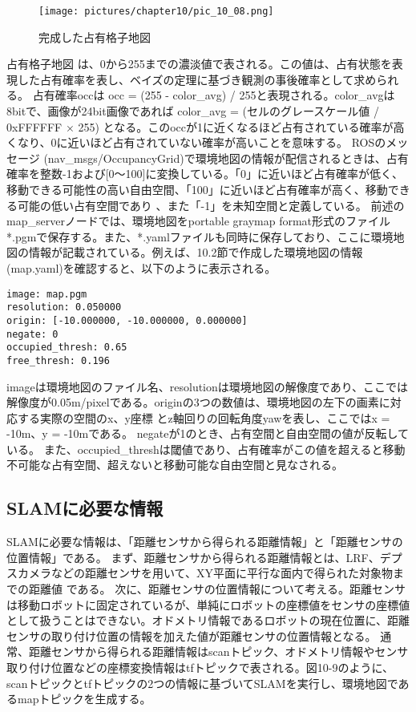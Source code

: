 \begin{figure}[htp]
  \centering
  \texttt{[image: pictures/chapter10/pic\_10\_08.png]}
  \caption{完成した占有格子地図}
\end{figure}

占有格子地図  は、0から255までの濃淡値で表される。この値は、占有状態を表現した占有確率を表し、ベイズの定理に基づき観測の事後確率として求められる。  占有確率occは occ = (255 - color\_avg) / 255と表現される。color\_avgは8bitで、画像が24bit画像であれば color\_avg = (セルのグレースケール値 / 0xFFFFFF × 255) となる。このoccが1に近くなるほど占有されている確率が高くなり、0に近いほど占有されていない確率が高いことを意味する。
ROSのメッセージ (nav\_msgs/OccupancyGrid)で環境地図の情報が配信されるときは、占有確率を整数-1および[0〜100]に変換している。「0」に近いほど占有確率が低く、移動できる可能性の高い自由空間、「100」に近いほど占有確率が高く、移動できる可能の低い占有空間であり  、また「-1」を未知空間と定義している。
前述のmap\_serverノードでは、環境地図をportable graymap format形式のファイル*.pgmで保存する。また、*.yamlファイルも同時に保存しており、ここに環境地図の情報が記載されている。例えば、10.2節で作成した環境地図の情報(map.yaml)を確認すると、以下のように表示される。

\begin{lstlisting}[language=ROS]
image: map.pgm
resolution: 0.050000
origin: [-10.000000, -10.000000, 0.000000]
negate: 0
occupied_thresh: 0.65
free_thresh: 0.196
\end{lstlisting}

imageは環境地図のファイル名、resolutionは環境地図の解像度であり、ここでは解像度が0.05m/pixelである。originの3つの数値は、環境地図の左下の画素に対応する実際の空間のx、y座標  とz軸回りの回転角度yawを表し、ここではx = -10m、y = -10mである。 negateが1のとき、占有空間と自由空間の値が反転している。  また、occupied\_threshは閾値であり、占有確率がこの値を超えると移動不可能な占有空間、超えないと移動可能な自由空間と見なされる。

\subsection{SLAMに必要な情報}

SLAMに必要な情報は、「距離センサから得られる距離情報」と「距離センサの位置情報」である。
まず、距離センサから得られる距離情報とは、LRF、デプスカメラなどの距離センサを用いて、XY平面に平行な面内で得られた対象物までの距離値  である。
次に、距離センサの位置情報について考える。距離センサは移動ロボットに固定されているが、単純にロボットの座標値をセンサの座標値として扱うことはできない。オドメトリ情報であるロボットの現在位置に、距離センサの取り付け位置の情報を加えた値が距離センサの位置情報となる。
通常、距離センサから得られる距離情報はscanトピック、オドメトリ情報やセンサ取り付け位置などの座標変換情報はtfトピックで表される。図10-9のように、scanトピックとtfトピックの2つの情報に基づいてSLAMを実行し、環境地図であるmapトピックを生成する。

